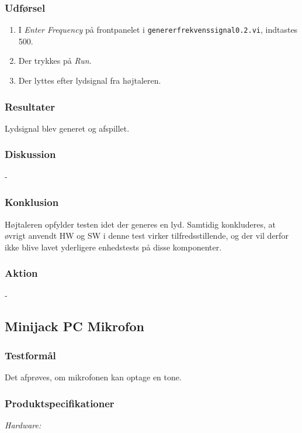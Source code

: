 		\subsubsection{Udførsel}
			\begin{enumerate}
				\item I \textit{Enter Frequency} på frontpanelet i \texttt{genererfrekvenssignal0.2.vi}, indtastes 500. 
				\item Der trykkes på \textit{Run}. 
				\item Der lyttes efter lydsignal fra højtaleren.  
			\end{enumerate}
			
		\subsubsection{Resultater}
		Lydsignal blev generet og afspillet. 
		\subsubsection{Diskussion} 
		-
		\subsubsection{Konklusion}
		Højtaleren opfylder testen idet der generes en lyd. Samtidig konkluderes, at øvrigt anvendt HW og SW i denne test virker tilfredsstillende, og der vil derfor ikke blive lavet yderligere enhedstests på disse komponenter. 
	
		\subsubsection{Aktion}
		- 
	\subsection{Minijack PC Mikrofon}
		\subsubsection{Testformål}
		Det afprøves, om mikrofonen kan optage en tone.
		\subsubsection{Produktspecifikationer}
	
			\textit{Hardware:}\\
			\mikrofon\\
			\PC\\
	
